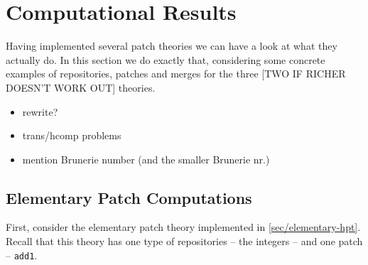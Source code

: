 \section{Computational Results}\label{sec:results}

Having implemented several patch theories we can have a look at what they actually do.
In this section we do exactly that, considering some concrete examples of repositories,
patches and merges for the three [TWO IF RICHER DOESN'T WORK OUT] theories.

\begin{itemize}
\item rewrite?
\item trans/hcomp problems
  \item mention Brunerie number (and the smaller Brunerie nr.)
\end{itemize}

\subsection{Elementary Patch Computations}

First, consider the elementary patch theory implemented in \autoref{sec/elementary-hpt}.
Recall that this theory has one type of repositories -- the integers -- and one patch
-- \texttt{add1}.

\begin{code}[hide]%
\>[0]\AgdaSymbol{\{-\#}\AgdaSpace{}%
\AgdaSpace{}%
\AgdaSpace{}%
\AgdaSpace{}%
\AgdaSymbol{\#-\}}\<%
\\
\>[0]\AgdaSpace{}%
\AgdaSpace{}%
\<%
\\
\>[0]\AgdaSpace{}%
\AgdaModule{\AgdaUnderscore{}}\AgdaSpace{}%
\<%
\\
\>[0][@{}l@{\AgdaIndent{0}}]%
\>[2]\AgdaSpace{}%
\AgdaSpace{}%
\<%
\\
%
\>[2]\AgdaSpace{}%
\AgdaSpace{}%
\<%
\\
%
\>[2]\AgdaSpace{}%
\AgdaSpace{}%
\<%
\\
%
\>[2]\AgdaSpace{}%
\AgdaSpace{}%
\<%
\end{code}

